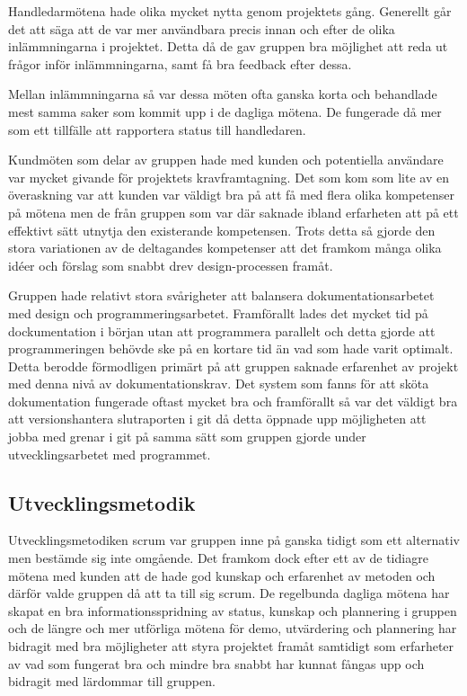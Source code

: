 Handledarmötena hade olika mycket nytta genom projektets gång. Generellt går det att säga att de var mer användbara precis innan och efter de olika inlämmningarna i projektet. Detta då de gav gruppen bra möjlighet att reda ut frågor inför inlämmningarna, samt få bra feedback efter dessa. 

Mellan inlämmningarna så var dessa möten ofta ganska korta och behandlade mest samma saker som kommit upp i de dagliga mötena. De fungerade då mer som ett tillfälle att rapportera status till handledaren.

Kundmöten som delar av gruppen hade med kunden och potentiella användare var mycket givande för projektets kravframtagning. Det som kom som lite av en överaskning var att kunden var väldigt bra på att få med flera olika kompetenser på mötena men de från gruppen som var där saknade ibland erfarheten att på ett effektivt sätt utnytja den existerande kompetensen. 
Trots detta så gjorde den stora variationen av de deltagandes kompetenser att det framkom många olika idéer och förslag som snabbt drev design-processen framåt. 

Gruppen hade relativt stora svårigheter att balansera dokumentationsarbetet med design och programmeringsarbetet. Framförallt lades det mycket tid på dockumentation i början utan att programmera parallelt och detta gjorde att programmeringen behövde ske på en kortare tid än vad som hade varit optimalt. Detta berodde förmodligen primärt på att gruppen saknade erfarenhet av projekt med denna nivå av dokumentationskrav. Det system som fanns för att sköta dokumentation fungerade oftast mycket bra och framförallt så var det väldigt bra att versionshantera slutraporten i git då detta öppnade upp möjligheten att jobba med grenar i git på samma sätt som gruppen gjorde under utvecklingsarbetet med programmet.  

\subsection{Utvecklingsmetodik}
Utvecklingsmetodiken scrum var gruppen inne på ganska tidigt som ett alternativ men bestämde sig inte omgående. Det framkom dock efter ett av de tidiagre mötena med kunden att de hade god kunskap och erfarenhet av metoden och därför valde gruppen då att ta till sig scrum. De regelbunda dagliga mötena har skapat en bra informationsspridning av status, kunskap och plannering i gruppen och de längre och mer utförliga mötena för demo, utvärdering och plannering har bidragit med bra möjligheter att styra projektet framåt samtidigt som erfarheter av vad som fungerat bra och mindre bra snabbt har kunnat fångas upp och bidragit med lärdommar till gruppen.

